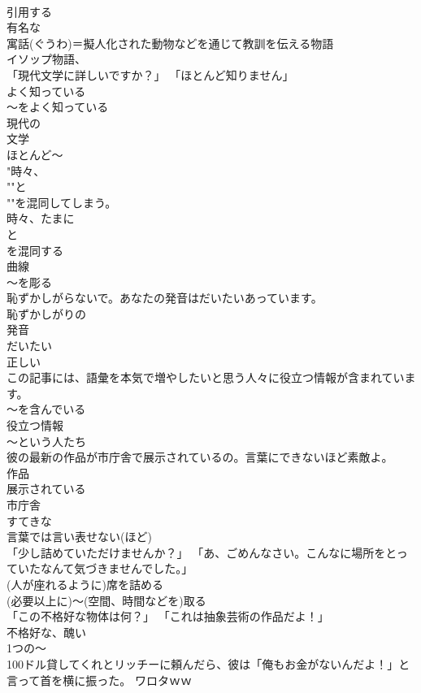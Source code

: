 \documentclass[8pt]{extreport}
\begin{document}
\begin{CJK}{UTF8}{min}
\\	引用する 
\\	有名な 
\\	寓話(ぐうわ)＝擬人化された動物などを通じて教訓を伝える物語
\\	イソップ物語、
\\	「現代文学に詳しいですか？」 「ほとんど知りません」	
\\	よく知っている 
\\	～をよく知っている 
\\	現代の 
\\	文学 
\\	ほとんど～
\\	"時々、
\\	""と
\\	""を混同してしまう。
\\	時々、たまに 
\\	と
\\	を混同する 
\\	曲線 
\\	～を彫る
\\	恥ずかしがらないで。あなたの発音はだいたいあっています。	
\\	恥ずかしがりの 
\\	発音 
\\	だいたい 
\\	正しい
\\	この記事には、語彙を本気で増やしたいと思う人々に役立つ情報が含まれています。	
\\	～を含んでいる 
\\	役立つ情報 
\\	～という人たち
\\	彼の最新の作品が市庁舎で展示されているの。言葉にできないほど素敵よ。	
\\	作品 
\\	展示されている 
\\	市庁舎 
\\	すてきな 
\\	言葉では言い表せない(ほど)
\\	「少し詰めていただけませんか？」 「あ、ごめんなさい。こんなに場所をとっていたなんて気づきませんでした。」	
\\	(人が座れるように)席を詰める 
\\	(必要以上に)～(空間、時間などを)取る
\\	「この不格好な物体は何？」 「これは抽象芸術の作品だよ！」	
\\	不格好な、醜い 
\\	1つの～
\\	100ドル貸してくれとリッチーに頼んだら、彼は「俺もお金がないんだよ！」と言って首を横に振った。 ワロタｗｗ	

\end{CJK}
\end{document}
